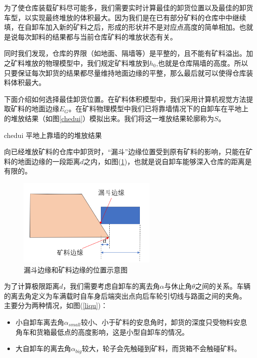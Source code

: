 \documentclass{my_paper}
\begin{document}
为了使仓库装载矿料尽可能多，我们需要实时计算最佳的卸货位置以及最佳的卸货车型，以实现最终堆放的体积最大。因为我们是在已有部分矿料的仓库中中继续填，在自卸车加入新的矿料之后，形成的形状并不是对应点高度的简单相加。也就是说每次卸料的结果都与当前仓库矿料的堆放状态有关。

同时我们发现，仓库的界限（如地面、隔墙等）是平整的，且不能有矿料溢出。加之矿料堆放的物理模型中，我们规定矿料堆放到$h_0$,也就是仓库隔墙的高度。所以只要保证每次卸货的结果都尽量维持地面边缘的平整，那么最后就可以使得仓库装料体积最大。

下面介绍如何选择最佳卸货位置。在矿料体积模型中，我们采用计算机视觉方法提取矿料的地面边缘$E_G$。在矿料物理模型中我们已将靠墙情况下的自卸车在平地上的堆放结果（如图\ref{chedui}）模拟出来。我们将这一堆放结果轮廓称为$S$。

chedui 平地上靠墙的的堆放结果

向已经堆放矿料的仓库中卸货时，“漏斗”边缘位置受到原有矿料的影响，只能在矿料的地面边缘的一段距离$d$之内，如图(\ref{kuangbian})，也就是说自卸车能够深入仓库的距离是有限的。

\begin {figure}[h]
\centering %
\includegraphics[width=0.6\textwidth]{kuangbian.png}
\caption{漏斗边缘和矿料边缘的位置示意图} %
\label{kuangbian}
\end {figure}

为了计算极限距离$d$，我们需要考虑自卸车的离去角$\alpha$与休止角$\theta$之间的关系。车辆的离去角定义为车满载时自车身后端突出点向后车轮引切线与路面之间的夹角\cite{liqu}。
主要分为两种情况，如图(\ref{liqu})：
\begin{itemize}
    \item 小自卸车离去角$\alpha_{small}$较小、小于矿料的安息角时，卸货的深度只受物料安息角车和货箱最低点的高度影响，这是小型自卸车的情况。
    \item 大自卸车的离去角$\alpha_{big}$较大，轮子会先触碰到矿料，而货箱不会触碰矿料。
\end{itemize}
\end{document}

